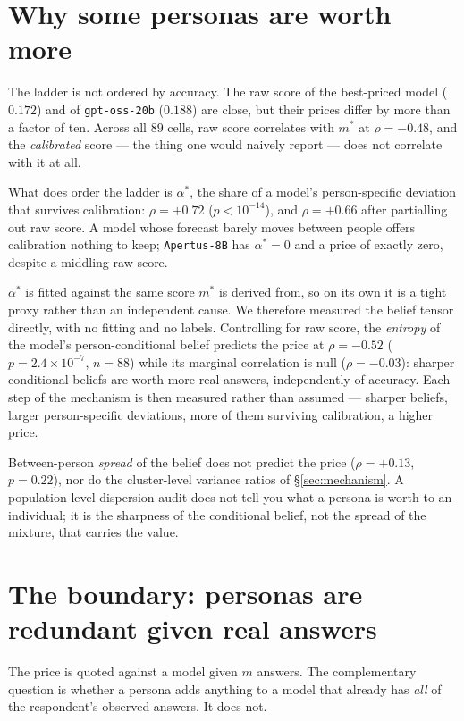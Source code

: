 \section{Why some personas are worth more}
\label{sec:why}

The ladder is not ordered by accuracy. The raw score of the best-priced model
($0.172$) and of \texttt{gpt-oss-20b} ($0.188$) are close, but their prices differ
by more than a factor of ten. Across all $89$ cells, raw score correlates with
$m^{*}$ at $\rho{=}-0.48$, and the \emph{calibrated} score --- the thing one would
naively report --- does not correlate with it at all.

What does order the ladder is $\alpha^{*}$, the share of a model's person-specific
deviation that survives calibration: $\rho{=}+0.72$ ($p{<}10^{-14}$), and
$\rho{=}+0.66$ after partialling out raw score. A model whose forecast barely
moves between people offers calibration nothing to keep; \texttt{Apertus-8B} has
$\alpha^{*}{=}0$ and a price of exactly zero, despite a middling raw score.

$\alpha^{*}$ is fitted against the same score $m^{*}$ is derived from, so on its
own it is a tight proxy rather than an independent cause. We therefore measured
the belief tensor directly, with no fitting and no labels. Controlling for raw
score, the \emph{entropy} of the model's person-conditional belief predicts the
price at $\rho{=}-0.52$ ($p{=}2.4\times10^{-7}$, $n{=}88$) while its marginal
correlation is null ($\rho{=}-0.03$): sharper conditional beliefs are worth more
real answers, independently of accuracy. Each step of the mechanism is then
measured rather than assumed --- sharper beliefs, larger person-specific
deviations, more of them surviving calibration, a higher price.

Between-person \emph{spread} of the belief does not predict the price
($\rho{=}+0.13$, $p{=}0.22$), nor do the cluster-level variance ratios of
\S\ref{sec:mechanism}. A population-level dispersion audit does not tell you what
a persona is worth to an individual; it is the sharpness of the conditional
belief, not the spread of the mixture, that carries the value.

\section{The boundary: personas are redundant given real answers}
\label{sec:boundary}

The price is quoted against a model given $m$ answers. The complementary question
is whether a persona adds anything to a model that already has \emph{all} of the
respondent's observed answers. It does not.

